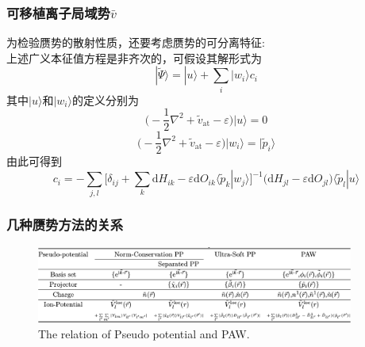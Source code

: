 \documentclass[cjk,slidestop,compress,mathserif,blue]{beamer}
\begin{document}
\frame
{
	\frametitle{\textrm{可移植离子局域势$\bar v$}}
	为检验赝势的散射性质，还要考虑赝势的可分离特征:\\
	上述广义本征值方程是非齐次的，可假设其解形式为
	$$|\tilde\Psi\rangle=|u\rangle+\sum_i|w_i\rangle c_i$$
	其中$|u\rangle$和$|w_i\rangle$的定义分别为
	$$\big(-\frac12\nabla^2+\tilde v_{\mathrm{at}}-\varepsilon\big)|u\rangle=0$$
	$$\big(-\frac12\nabla^2+\tilde v_{\mathrm{at}}-\varepsilon\big)|w_i\rangle=|\tilde p_i\rangle$$
	由此可得到
	$$c_i=-\sum_{j,l}\bigg[\delta_{ij}+\sum_k\mathrm{d}H_{ik}-\varepsilon\mathrm{d}O_{ik}\langle\tilde p_k|w_j\rangle\bigg]^{-1}\big(\mathrm{d}H_{jl}-\varepsilon\mathrm{d}O_{jl}\big)\langle\tilde p_l|u\rangle$$
}

\frame
{
	\frametitle{几种赝势方法的关系}
\begin{figure}[h!]
\centering
\includegraphics[height=1.0in,width=4.1in,clip]{Figures/Pseudo-Potential.png}
\caption{\tiny \textrm{The relation of Pseudo potential and PAW.}}%
\label{Pseudo_Potential_PAW}
\end{figure}
}

\end{document}
